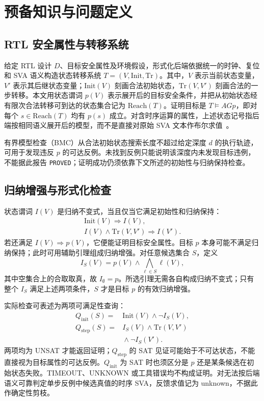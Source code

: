 \section{预备知识与问题定义}

\subsection{RTL 安全属性与转移系统}

给定 RTL 设计 $D$、目标安全属性及环境假设，形式化后端依据统一的时钟、复位和 SVA 语义构造状态转移系统 $T=(V,\mathrm{Init},\mathrm{Tr})$。其中，$V$ 表示当前状态变量，$V'$ 表示其后继状态变量；$\mathrm{Init}(V)$ 刻画合法初始状态，$\mathrm{Tr}(V,V')$ 刻画合法的一步转移。本文用状态谓词 $p(V)$ 表示展开后的目标安全条件，并把从初始状态经有限次合法转移可到达的状态集合记为 $\mathrm{Reach}(T)$。证明目标是 $T\models AGp$，即对每个 $s\in\mathrm{Reach}(T)$ 均有 $p(s)$ 成立。对含时序运算的属性，上述状态记号指后端按相同语义展开后的模型，而不是直接对原始 SVA 文本作布尔求值~\cite{peled2026large}。

有界模型检查（BMC）从合法初始状态搜索长度不超过给定深度 $d$ 的执行轨迹，可用于发现违反 $p$ 的可达反例。未找到反例只能说明该深度内未发现目标违例，不能据此报告 \texttt{PROVED}；证明成功仍须依靠下文所述的初始性与归纳保持检查。

\subsection{归纳增强与形式化检查}

状态谓词 $I(V)$ 是归纳不变式，当且仅当它满足初始性和归纳保持：
\[
\begin{array}{l}
\mathrm{Init}(V)\Rightarrow I(V),\\
I(V)\land\mathrm{Tr}(V,V')\Rightarrow I(V').
\end{array}
\]
若还满足 $I(V)\Rightarrow p(V)$，它便能证明目标安全属性。目标 $p$ 本身可能不满足归纳保持；此时可用辅助引理组成归纳增强。对任意候选集合 $S$，定义
\[
I_S(V)=p(V)\land\bigwedge_{\ell\in S}\ell(V),
\]
其中空集合上的合取取真，故 $I_{\emptyset}=p$。所选引理无需各自构成归纳不变式；只有整个 $I_S$ 满足上述两项条件，$S$ 才是目标 $p$ 的有效归纳增强。

实际检查可表述为两项可满足性查询：
\[
\begin{array}{rl}
Q_{\mathrm{init}}(S)={}&\mathrm{Init}(V)\land\neg I_S(V),\\
Q_{\mathrm{step}}(S)={}&I_S(V)\land\mathrm{Tr}(V,V')\\
&{}\land\neg I_S(V').
\end{array}
\]
两项均为 UNSAT 才能返回证明；$Q_{\mathrm{step}}$ 的 SAT 见证可能始于不可达状态，不能直接视为目标属性的可达反例。$Q_{\mathrm{init}}$ 为 SAT 时也须区分是 $p$ 还是某条候选在初始状态失败。TIMEOUT、UNKNOWN 或工具错误均不构成证明。对无法按后端语义可靠判定单步反例中候选真值的时序 SVA，反馈求值记为 unknown，不据此作确定性剪枝。

